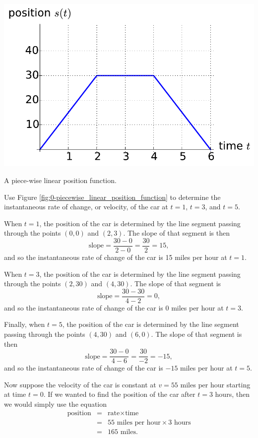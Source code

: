 \begin{marginfigure}[1in] %
\includegraphics[width=\marginparwidth]{figs/0/piecewise_linear_position_function.pdf}
\caption{A piece-wise linear position function.}
\label{fig:0-piecewise_linear_position_function}
\end{marginfigure}

\begin{example} %
Use Figure \ref{fig:0-piecewise_linear_position_function} to determine the instantaneous rate of change, or velocity, of the car at $t = 1$, $t = 3$, and $t = 5$. 

\solution When $t = 1$, the position of the car is determined by the line segment passing through the points $(0,0)$ and $(2,3)$.  The slope of that segment is then
\[ \mbox{slope} = \frac{30 - 0}{2 - 0} = \frac{30}{2} = 15, \]
and so the instantaneous rate of change of the car is 15 miles per hour at $t = 1$.

When $t = 3$, the position of the car is determined by the line segment passing through the points $(2,30)$ and $(4,30)$.  The slope of that segment is
\[ \mbox{slope} = \frac{30 - 30}{4 - 2} = 0, \]
and so the instantaneous rate of change of the car is 0 miles per hour at $t = 3$.

Finally, when $t = 5$, the position of the car is determined by the line segment passing through the points $(4,30)$ and $(6,0)$.  The slope of that segment is then
\[ \mbox{slope} = \frac{30 - 0}{4 - 6} = \frac{30}{-2} = -15, \]
and so the instantaneous rate of change of the car is $-15$ miles per hour at $t = 5$.
\end{example}

Now suppose the velocity of the car is constant at $v = 55$ miles per hour starting at time $t=0$. If we wanted to find the position of the car after $t=3$ hours, then we would simply use the equation
\begin{eqnarray*}
\mbox{position}	& = & \mbox{rate} \times \mbox{time} \\
& = & 55 \mbox{ miles per hour} \times 3 \mbox{ hours} \\
& = & 165 \mbox{ miles.} 
\end{eqnarray*}

